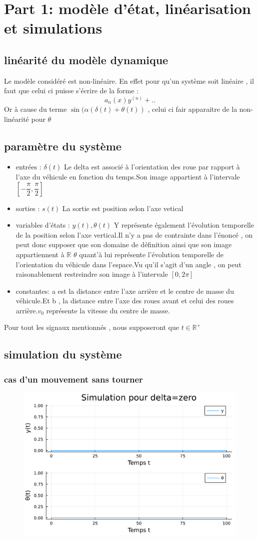 \documentclass[11pt,a4paper]{article}
\begin{document}

\section{Part 1: modèle d'état, linéarisation et simulations}
\subsection{linéarité du modèle dynamique}
Le modèle considéré est non-linéaire.
En effet pour qu'un système soit linéaire , il faut que celui ci puisse s'écrire de la forme :
$$ a_n (x) y^{(n)}+ ..$$
Or à cause du terme $\sin(\alpha(\delta(t)+\theta(t))$ , celui ci fair apparaitre de la non-linéarité pour $\theta$
\subsection{paramètre du système}
\begin{itemize}
    \item entrées : $\delta(t)$
    Le delta est associé à l'orientation des roue par rapport à l'axe du véhicule en fonction du temps.Son image appartient à l'intervale $[-\dfrac{\pi}{2},\dfrac{\pi}{2}]$
    \item sorties : $s(t)$
    La sortie est position selon l'axe vetical
    \item variables d'états : $y(t),\theta(t)$
    Y représente également l'évolution temporelle de la position selon l'axe vertical.Il n'y a pas de contrainte dans l'énoncé , on peut donc supposer que son domaine de définition ainsi que son image appartiennent à $\mathbb{R}$
    $\theta$ quant'à lui représente l'évolution temporelle de l'orientation du véhicule dans l'espace.Vu qu'il s'agit d'un angle , on peut raisonablement restreindre son image à l'intervale $[ 0,2\pi]$
    \item constantes: a est la distance entre l'axe arrière et le centre de masse du véhicule.Et b , la distance entre l'axe des roues avant et celui des roues arrière.$v_0$ représente la vitesse du centre de masse.
\end{itemize}
Pour tout les signaux mentionnés , nous supposeront que $t \in \mathbb{R}^+$
\subsection{simulation du système}
\subsubsection{cas d'un mouvement sans tourner}
\begin{figure}[!h]
    \centering
    \includegraphics[width=0.5\linewidth]{jlplots/Q1_3_zero.pdf}
\end{figure}
\newpage
\end{document}
